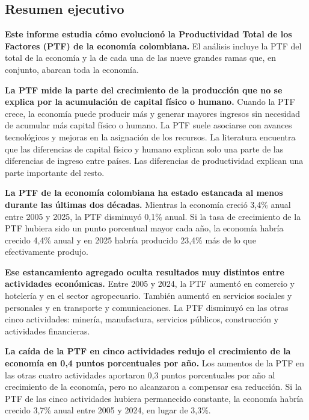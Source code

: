 \documentclass[12pt, a4paper]{article}
\begin{document}
\begin{mdframed}[
  linewidth=1pt,
  linecolor=gray!60,
  backgroundcolor=gray!6,
  innertopmargin=12pt,
  innerbottommargin=12pt,
  innerleftmargin=14pt,
  innerrightmargin=14pt
]
\section*{Resumen ejecutivo}
\small

\textbf{Este informe estudia cómo evolucionó la Productividad Total de los Factores (PTF) de la economía colombiana.} El análisis incluye la PTF del total de la economía y la de cada una de las nueve grandes ramas que, en conjunto, abarcan toda la economía.

\textbf{La PTF mide la parte del crecimiento de la producción que no se explica por la acumulación de capital físico o humano.} Cuando la PTF crece, la economía puede producir más y generar mayores ingresos sin necesidad de acumular más capital físico o humano. La PTF suele asociarse con avances tecnológicos y mejoras en la asignación de los recursos. La literatura encuentra que las diferencias de capital físico y humano explican solo una parte de las diferencias de ingreso entre países. Las diferencias de productividad explican una parte importante del resto.

\textbf{La PTF de la economía colombiana ha estado estancada al menos durante las últimas dos décadas.} Mientras la economía creció 3,4\% anual entre 2005 y 2025, la PTF disminuyó 0,1\% anual. Si la tasa de crecimiento de la PTF hubiera sido un punto porcentual mayor cada año, la economía habría crecido 4,4\% anual y en 2025 habría producido 23,4\% más de lo que efectivamente produjo.

\textbf{Ese estancamiento agregado oculta resultados muy distintos entre actividades económicas.} Entre 2005 y 2024, la PTF aumentó en comercio y hotelería y en el sector agropecuario. También aumentó en servicios sociales y personales y en transporte y comunicaciones. La PTF disminuyó en las otras cinco actividades: minería, manufactura, servicios públicos, construcción y actividades financieras.

\textbf{La caída de la PTF en cinco actividades redujo el crecimiento de la economía en 0,4 puntos porcentuales por año.} Los aumentos de la PTF en las otras cuatro actividades aportaron 0,3 puntos porcentuales por año al crecimiento de la economía, pero no alcanzaron a compensar esa reducción. Si la PTF de las cinco actividades hubiera permanecido constante, la economía habría crecido 3,7\% anual entre 2005 y 2024, en lugar de 3,3\%.


\end{mdframed}
\end{document}
